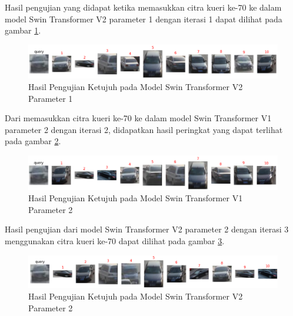 Hasil pengujian yang didapat ketika memasukkan citra kueri ke-70 ke dalam model Swin Transformer V2 parameter 1 dengan 
iterasi 1 dapat dilihat pada gambar \ref{fig:hasilpengujianketujuhpadamodelswintransformerv2param1}.

\begin{figure}[h!]
  \centering
  \includegraphics[scale=0.6]{gambar/Que70V2P1IT1.png}
  \caption{Hasil Pengujian Ketujuh pada Model Swin Transformer V2 Parameter 1}
  \label{fig:hasilpengujianketujuhpadamodelswintransformerv2param1}
\end{figure}

Dari memasukkan citra kueri ke-70 ke dalam model Swin Transformer V1 parameter 2 dengan iterasi 2, didapatkan hasil 
peringkat yang dapat terlihat pada gambar \ref{fig:hasilpengujianketujuhpadamodelswintransformerv1param2}.

\begin{figure}[h!]
  \centering
  \includegraphics[scale=0.6]{gambar/Que70V1P2IT2.png}
  \caption{Hasil Pengujian Ketujuh pada Model Swin Transformer V1 Parameter 2}
  \label{fig:hasilpengujianketujuhpadamodelswintransformerv1param2}
\end{figure}

Hasil pengujian dari model Swin Transformer V2 parameter 2 dengan iterasi 3 menggunakan citra kueri ke-70 dapat 
dilihat pada gambar \ref{fig:hasilpengujianketujuhpadamodelswintransformerv2param2}.

\begin{figure}[h!]
  \centering
  \includegraphics[scale=0.6]{gambar/Que70V2P2IT3.png}
  \caption{Hasil Pengujian Ketujuh pada Model Swin Transformer V2 Parameter 2}
  \label{fig:hasilpengujianketujuhpadamodelswintransformerv2param2}
\end{figure}

